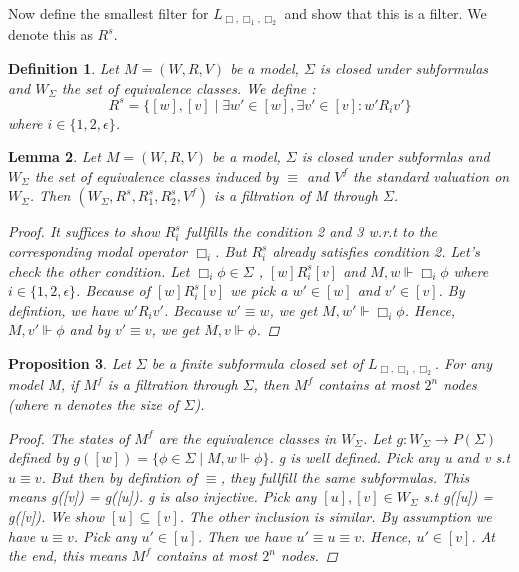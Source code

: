 \documentclass[12pt, a4paper]{scrartcl}
\newtheorem{definition}{Definition}[subsection]
\newtheorem{lemma}[definition]{Lemma}
\newtheorem{proposition}[definition]{Proposition}
\begin{document}
Now define the smallest filter for $L_{\Box,\Box_1,\Box_2}$ and show that this is a filter. We denote this as $R^s$.

\begin{definition}
    Let $M = (W,R,V)$ be a model, $\Sigma$ is closed under subformulas and $W_\Sigma$ the set of equivalence classes. We define :
    $$R^s = \{[w],[v] \mid \exists w' \in [w], \exists v' \in [v] : w'R_i v'\}$$
    where $i \in \{1,2,\epsilon\}$.    
\end{definition}

\begin{lemma}
    Let $M = (W,R,V)$ be a model, $\Sigma$ is closed under subformlas and $W_\Sigma$ the set of equivalence classes induced by $\equiv$ and $V^f$ the standard valuation on $W_\Sigma$. Then $(W_\Sigma, R^s,R^s_1,R^s_2,V^f)$ is 
    a filtration of M through $\Sigma$.
    \begin{proof}
    
    It suffices to show $R^s_i$ fullfills the condition 2 and 3 w.r.t to the corresponding modal operator $\Box_i$. But $R^s_i$ already satisfies condition 2.
    Let's check the other condition. Let $\Box_i \phi \in \Sigma$ , $[w]R^s_i[v]$ and $M,w \Vdash \Box_i \phi$ where $i \in \{1,2, \epsilon\}$. Because of $[w]R^s_i[v]$ we pick a $w' \in [w]$
    and $v' \in [v]$. By defintion, we have $w'R_i v'$. Because $w' \equiv w$, we get $M,w' \Vdash \Box_i \phi$. Hence, $M,v' \Vdash \phi$ and by $v' \equiv v$, we get $M,v \Vdash \phi$.
    
    \end{proof}    
\end{lemma}

\begin{proposition}
    Let $\Sigma$ be a finite subformula closed set of $L_{\Box,\Box_1,\Box_2}$. For any model M, if $M^f$ is a filtration through $\Sigma$, then $M^f$ contains at most $2^n$ nodes (where n denotes the size of $\Sigma$).

    \begin{proof}
    The states of $M^f$ are the equivalence classes in $W_\Sigma$. Let $g : W_\Sigma \rightarrow P(\Sigma)$ defined by $g([w]) = \{ \phi \in \Sigma \mid M,w \Vdash \phi\}$.
    g is well defined. Pick any u and v s.t $u\equiv v$. But then by defintion of $\equiv$, they fullfill the same subformulas. This means g([v]) = g([u]). \newline
    g is also injective. Pick any $[u],[v] \in W_\Sigma$ s.t g([u]) = g([v]). We show $[u]\subseteq[v]$. The other inclusion is similar.
    By assumption we have $u \equiv v$. Pick any $u' \in [u]$. Then we have $u' \equiv u \equiv v$. Hence, $u' \in [v]$. At the end, this means $M^f$ contains at most $2^n$ nodes.

    \end{proof}     
\end{proposition}
\end{document}
